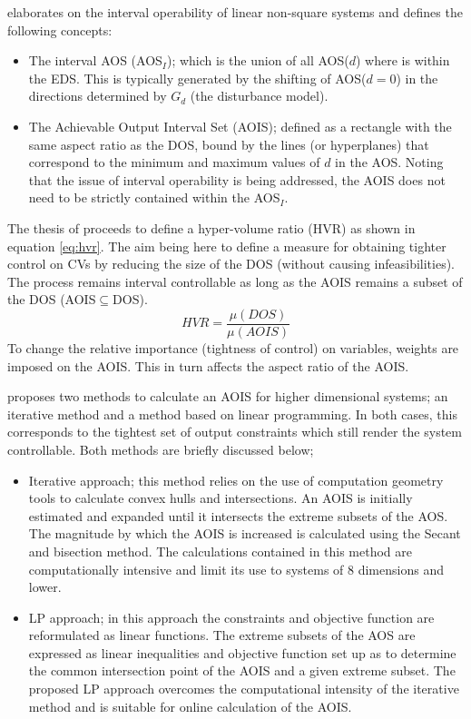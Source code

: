 \citet{limaphd} elaborates on the interval operability of linear non-square 
systems and defines the following concepts:
\begin{itemize}
  \item The interval AOS (AOS$_I$); which is the union of all AOS($d$) where
    is within the EDS. This is typically generated by the shifting of
    AOS($d=0$) in the directions determined by $G_d$ (the disturbance model).
  \item The Achievable Output Interval Set (AOIS); defined as a rectangle
    with the same aspect ratio as the DOS, bound by the lines (or hyperplanes)
    that correspond to the minimum and maximum values of $d$ in the AOS. Noting
    that the issue of interval operability is being addressed, the AOIS does
    not need to be strictly contained within the AOS$_I$.
\end{itemize}
The thesis of \citet{limaphd} proceeds to define a hyper-volume ratio (HVR) as
shown in equation \ref{eq:hvr}. The aim being here to define a measure for
obtaining tighter control on CVs by reducing the size of the DOS (without
causing infeasibilities). The process remains interval controllable as long as 
the AOIS remains a subset of the DOS (AOIS$\subseteq$DOS).
\begin{equation}
  \label{eq:hvr}
    HVR = \frac{\mu(DOS)}{\mu(AOIS)}
\end{equation}
To change the relative importance (tightness of control) on variables, weights
are imposed on the AOIS. This in turn affects the aspect ratio of the AOIS.

\citet{limaphd} proposes two methods to calculate an AOIS for higher dimensional
systems; an iterative method and a method based on linear programming. In both 
cases, this corresponds to the tightest set of output constraints which still 
render the system controllable. Both methods are briefly discussed below;
\begin{itemize}
  \item Iterative approach; this method relies on the use of computation
    geometry tools to calculate convex hulls and intersections. An AOIS is 
    initially estimated and expanded until it intersects the extreme subsets of
    the AOS. The magnitude by which the AOIS is increased is calculated using
    the Secant and bisection method. The calculations contained in this method
    are computationally intensive and limit its use to systems of 8 dimensions
    and lower.
  \item LP approach; in this approach the constraints and objective function
    are reformulated as linear functions. The extreme subsets of the AOS are
    expressed as linear inequalities and objective function set up as to
    determine the common intersection point of the AOIS and a given extreme
    subset. The proposed LP approach overcomes the computational intensity of
    the iterative method and is suitable for online calculation of the AOIS.
\end{itemize}


